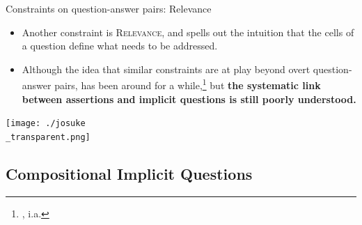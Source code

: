 \documentclass[10pt]{beamer}
\newcommand{\footciteia}[1]{\footnote{\cite{#1}, i.a.}}
\begin{document}
\begin{frame}{Constraints on question-answer pairs: Relevance}
	\begin{itemize}
		\item Another constraint is \textsc{Relevance}, and spells out the intuition that the cells of a question define what needs to be addressed.
		\begin{exe}
		\end{exe}\pause
		\item Although the idea that similar constraints are at play beyond overt question-answer pairs, has been around for a while,\footciteia{Lewis1988,Roberts1996,Riester2019} but \textbf{the systematic link between assertions and implicit questions is still poorly understood.}
	\end{itemize}
\end{frame}



\usebackgroundtemplate%
{%
		\texttt{[image: ./josuke\\\_transparent.png]}%
	}
\begin{frame}
	\section[Compositional Implicit Questions]{Compositional Implicit Questions}
\end{frame}
\usebackgroundtemplate{}
\end{document}
